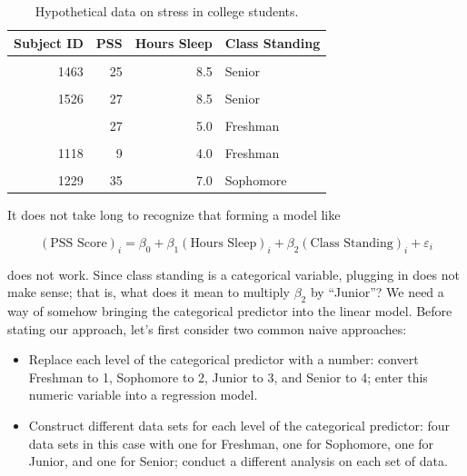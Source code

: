 \documentclass[
  letterpaper,
  DIV=11,
  numbers=noendperiod]{scrreprt}
\providecommand{\tightlist}{%
  \setlength{\itemsep}{0pt}\setlength{\parskip}{0pt}}\usepackage{longtable,booktabs,array}
\theoremstyle{definition}
\theoremstyle{definition}
\theoremstyle{remark}
\begin{document}
\hypertarget{tbl-modeling-categorical-predictors-stress-data}{}
\begin{table}
\caption{\label{tbl-modeling-categorical-predictors-stress-data}Hypothetical data on stress in college students. }\tabularnewline

\centering
\begin{tabular}[t]{rrrl}
\toprule
Subject ID & PSS & Hours Sleep & Class Standing\\
\midrule
\cellcolor{gray!6}{1415} & \cellcolor{gray!6}{14} & \cellcolor{gray!6}{7.5} & \cellcolor{gray!6}{Freshman}\\
1463 & 25 & 8.5 & Senior\\
\cellcolor{gray!6}{1179} & \cellcolor{gray!6}{26} & \cellcolor{gray!6}{7.0} & \cellcolor{gray!6}{Junior}\\
1526 & 27 & 8.5 & Senior\\
\cellcolor{gray!6}{1195} & \cellcolor{gray!6}{5} & \cellcolor{gray!6}{8.0} & \cellcolor{gray!6}{Sophomore}\\
\addlinespace
1938 & 27 & 5.0 & Freshman\\
\cellcolor{gray!6}{1818} & \cellcolor{gray!6}{28} & \cellcolor{gray!6}{5.5} & \cellcolor{gray!6}{Junior}\\
1118 & 9 & 4.0 & Freshman\\
\cellcolor{gray!6}{1299} & \cellcolor{gray!6}{29} & \cellcolor{gray!6}{9.0} & \cellcolor{gray!6}{Freshman}\\
1229 & 35 & 7.0 & Sophomore\\
\bottomrule
\end{tabular}
\end{table}

It does not take long to recognize that forming a model like

\[(\text{PSS Score})_i = \beta_0 + \beta_1 (\text{Hours Sleep})_i + \beta_2 (\text{Class Standing})_i + \varepsilon_i\]

does not work. Since class standing is a categorical variable, plugging
in does not make sense; that is, what does it mean to multiply
\(\beta_2\) by ``Junior''? We need a way of somehow bringing the
categorical predictor into the linear model. Before stating our
approach, let's first consider two common naive approaches:

\begin{itemize}
\tightlist
\item
  Replace each level of the categorical predictor with a number: convert
  Freshman to 1, Sophomore to 2, Junior to 3, and Senior to 4; enter
  this numeric variable into a regression model.
\item
  Construct different data sets for each level of the categorical
  predictor: four data sets in this case with one for Freshman, one for
  Sophomore, one for Junior, and one for Senior; conduct a different
  analysis on each set of data.
\end{itemize}
\end{document}
